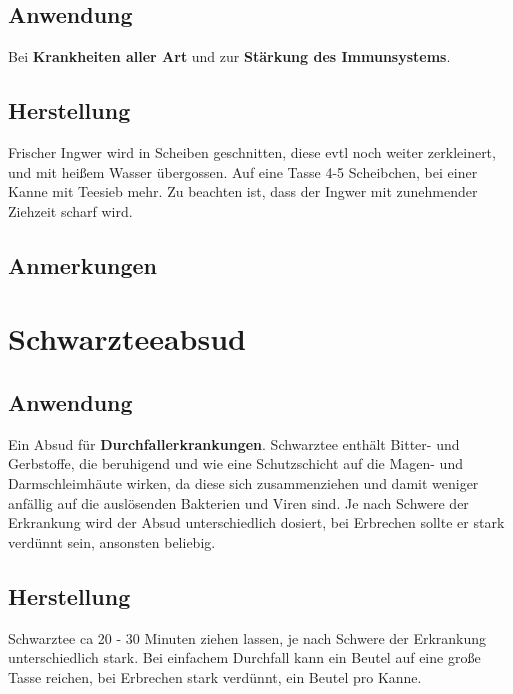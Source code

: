   

\subsection{Anwendung}

Bei \textbf{Krankheiten aller Art} und zur \textbf{Stärkung des Immunsystems}.

\subsection{Herstellung}

Frischer Ingwer wird in Scheiben geschnitten, diese evtl noch weiter zerkleinert, und mit heißem Wasser übergossen. Auf eine Tasse 4-5 Scheibchen, bei einer Kanne mit Teesieb mehr. Zu beachten ist, dass der Ingwer mit zunehmender Ziehzeit scharf wird.

\subsection{Anmerkungen}






\section{Schwarzteeabsud}


\subsection{Anwendung}

Ein Absud für \textbf{Durchfallerkrankungen}. Schwarztee enthält Bitter- und Gerbstoffe, die beruhigend und wie eine Schutzschicht auf die Magen- und Darmschleimhäute wirken, da diese sich zusammenziehen und damit weniger anfällig auf die auslösenden Bakterien und Viren sind. Je nach Schwere der Erkrankung wird der Absud unterschiedlich dosiert, bei Erbrechen sollte er stark verdünnt sein, ansonsten beliebig.

\subsection{Herstellung}

Schwarztee ca 20 - 30 Minuten ziehen lassen, je nach Schwere der Erkrankung unterschiedlich stark. Bei einfachem Durchfall kann ein Beutel auf eine große Tasse reichen, bei Erbrechen stark verdünnt, ein Beutel pro Kanne.

